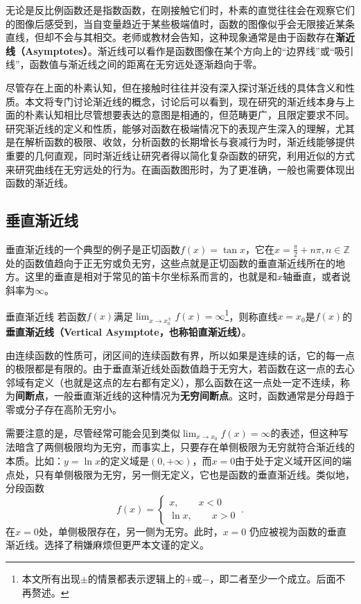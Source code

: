 
无论是反比例函数还是指数函数，在刚接触它们时，朴素的直觉往往会在观察它们的图像后感受到，当自变量趋近于某些极端值时，函数的图像似乎会无限接近某条直线，但却不会与其相交。老师或教材会告知，这种现象通常是由于函数存在\textbf{渐近线（Asymptotes）}。渐近线可以看作是函数图像在某个方向上的“边界线”或“吸引线”，函数值与渐近线之间的距离在无穷远处逐渐趋向于零。

尽管存在上面的朴素认知，但在接触时往往并没有深入探讨渐近线的具体含义和性质。本文将专门讨论渐近线的概念，讨论后可以看到，现在研究的渐近线本身与上面的朴素认知相比尽管想要表达的意图是相通的，但范畴更广，且限定要求不同。研究渐近线的定义和性质，能够对函数在极端情况下的表现产生深入的理解，尤其是在解析函数的极限、收敛，分析函数的长期增长与衰减行为时，渐近线能够提供重要的几何直观，同时渐近线让研究者得以简化复杂函数的研究，利用近似的方式来研究曲线在无穷远处的行为。在画函数图形时，为了更准确，一般也需要体现出函数的渐近线。

\subsection{垂直渐近线}

垂直渐近线的一个典型的例子是正切函数$f(x)=\tan x$，它在$\displaystyle x = \frac{\pi}{2} + n\pi,n \in \mathbb{Z}$处的函数值趋向于正无穷或负无穷，这些点就是正切函数的垂直渐近线所在的地方。这里的垂直是相对于常见的笛卡尔坐标系而言的，也就是和$x$轴垂直，或者说斜率为$\infty$。

\begin{definition}{垂直渐近线}
若函数$f(x)$满足$\displaystyle \lim_{x\to x_0^\pm}f(x)=\infty$\footnote{本文所有出现$\pm$的情景都表示逻辑上的$+$或$-$，即二者至少一个成立。后面不再赘述。}，则称直线$x=x_0$是$f(x)$的\textbf{垂直渐近线（Vertical Asymptote，也称铅直渐近线）}。
\end{definition}

由连续函数的性质可，闭区间的连续函数有界，所以如果是连续的话，它的每一点的极限都是有限的。由于垂直渐近线处函数值趋于无穷大，若函数在这一点的去心邻域有定义（也就是这点的左右都有定义），那么函数在这一点处一定不连续，称为\textbf{间断点}，一般垂直渐近线的这种情况为\textbf{无穷间断点}。这时，函数通常是分母趋于零或分子存在高阶无穷小。

需要注意的是，尽管经常可能会见到类似$\displaystyle \lim_{x\to x_0}f(x)=\infty$的表述，但这种写法暗含了两侧极限均为无穷，而事实上，只要存在单侧极限为无穷就符合渐近线的本质。比如：$y=\ln x$的定义域是$(0,+\infty)$，而$x=0$由于处于定义域开区间的端点处，只有单侧极限为无穷，另一侧无定义，它也是函数的垂直渐近线。类似地，分段函数
\begin{equation}
f(x)=\begin{cases}
x,\qquad x<0\\
\ln x,\qquad x>0
\end{cases}~.
\end{equation}
在$x=0$处，单侧极限存在，另一侧为无穷。此时，$x = 0$ 仍应被视为函数的垂直渐近线。选择了稍嫌麻烦但更严本文谨的定义。

